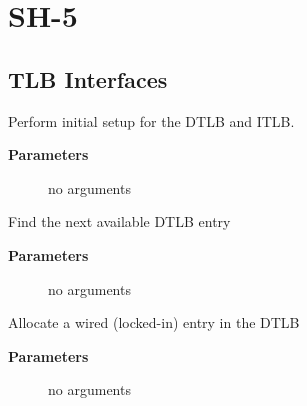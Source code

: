 \documentclass[a4paper,8pt,english]{sphinxmanual}
\begin{document}
\section{SH-5}
\label{sh/index:sh-5}

\subsection{TLB Interfaces}
\label{sh/index:tlb-interfaces}

\begin{fulllineitems}
\label{sh/index:c.sh64_tlb_init}
Perform initial setup for the DTLB and ITLB.

\end{fulllineitems}


\textbf{Parameters}
\begin{description}
\item[{}] \leavevmode
no arguments

\end{description}

\begin{fulllineitems}
\label{sh/index:c.sh64_next_free_dtlb_entry}
Find the next available DTLB entry

\end{fulllineitems}


\textbf{Parameters}
\begin{description}
\item[{}] \leavevmode
no arguments

\end{description}

\begin{fulllineitems}
\label{sh/index:c.sh64_get_wired_dtlb_entry}
Allocate a wired (locked-in) entry in the DTLB

\end{fulllineitems}


\textbf{Parameters}
\begin{description}
\item[{}] \leavevmode
no arguments

\end{description}
\end{document}

